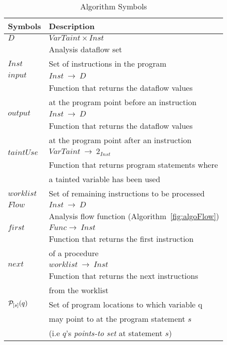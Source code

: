 \begin{table}
\begin{tabular}{|l|l|}
\hline
\textbf{Symbols}	&	\textbf{Description}							\\ \hline
$D$					&	$VarTaint \times Inst$							\\
					&	Analysis dataflow set 							\\ \hline
$Inst$				&	Set of instructions in the program 				\\ \hline
$input$				&	$Inst\ \rightarrow\ D$ 							\\
					&	Function that returns the dataflow values		\\
		    		&	at the program point before an instruction 		\\ 	\hline
$output$			&	$Inst\ \rightarrow\ D$ 							\\
					&	Function that returns the dataflow values		\\
		    		&	at the program point after an instruction 		\\ 	\hline
$taintUse$			&	$VarTaint\ \rightarrow\ 2_{Inst}$ 				\\
					&	Function that returns program statements where	\\
		    		&	a tainted variable has been used	 			\\ 	\hline		    		
$worklist$			&	Set of remaining instructions to be processed 	\\ \hline
$Flow$				&	$Inst\ \rightarrow\ D$ 							\\
					&   Analysis flow function (Algorithm~\ref{fig:algoFlow}) 			\\ \hline
$first$				&	$Func \rightarrow\ Inst$ 						\\
					& 	Function that returns the first instruction		\\
					&	of a procedure									\\ \hline
$next$				&	$worklist\ \rightarrow\ Inst$ 					\\
					& 	Function that returns the next instructions		\\
					&	from the worklist								\\ \hline
$\mathcal{P}_{[s]}(q)$	&	Set of program locations to which variable q	\\
					&	may point to at the program statement $s$		\\
					& 	(i.e $q$'s \textit{points-to set} at statement $s$)	\\ \hline					
\end{tabular}
\caption{Algorithm Symbols}\label{symTable}
\end{table}

